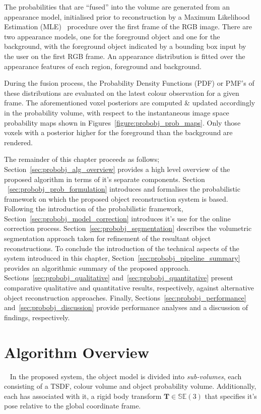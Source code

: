 The probabilities that are ``fused'' into the volume are generated from an
appearance model, initialised prior to reconstruction by a Maximum Likelihood 
Estimation (MLE)~\cite{BishopPRML} procedure over the first frame of the RGB image. 
There are two appearance models, one for the foreground object and one for the 
background, with the foreground object indicated by a bounding box input by the user
on the first RGB frame. An appearance distribution is fitted over the appearance 
features of each region, foreground and background. 

During the fusion process, the Probability Density Functions (PDF) or PMF's of 
these distributions are evaluated on the latest colour observation for a given frame. The aforementioned 
voxel posteriors are computed \& updated accordingly in the probability volume, with respect to the 
instantaneous image space probability maps shown in Figures~\ref{figure:probobj_prob_maps}. Only those 
voxels with a posterior higher for the foreground than the background are rendered.

The remainder of this chapter proceeds as follows; Section~\ref{sec:probobj_alg_overview} provides a high 
level overview of the proposed algorithm in terms of it's separate components. Section
~\ref{sec:probobj_prob_formulation} introduces and formalises the probabilistic framework on which the 
proposed object reconstruction system is based. Following the introduction of the probabilistic framework, 
Section~\ref{sec:probobj_model_correction} introduces it's use for the online correction process. 
Section~\ref{sec:probobj_segmentation} describes the volumetric segmentation approach taken for refinement 
of the resultant object reconstructions. To conclude the introduction of the technical aspects of the system 
introduced in this chapter, Section~\ref{sec:probobj_pipeline_summary} provides an algorithmic summary of the 
proposed approach. Sections~\ref{sec:probobj_qualitative} and~\ref{sec:probobj_quantitative} present comparative 
qualitative and quantitative results, respectively, against alternative object reconstruction approaches. Finally, 
Sections~\ref{sec:probobj_performance} and~\ref{sec:probobj_discussion} provide performance analyses and a 
discussion of findings, respectively.

\section{Algorithm Overview}
~\label{sec:probobj_alg_overview}
In the proposed system, the object model is divided into \textit{sub-volumes}, 
each consisting of a TSDF, colour volume and object probability volume.
Additionally, each has associated with it, a rigid body transform 
\(\bm{T} \in \mathbb{SE}(3)\) that specifies it's pose relative to the global 
coordinate frame.


